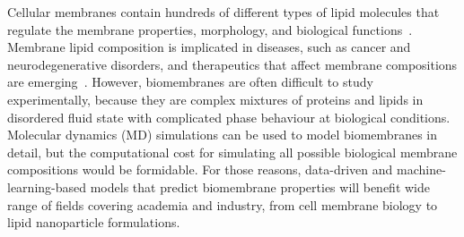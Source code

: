 \documentclass[fleqn,10pt]{wlscirep}
\begin{document}
Cellular membranes contain hundreds of different types of lipid molecules that regulate the membrane properties, morphology, and biological functions~\cite{vanmeer08,Lorent:2020a,Slatter:2016a}. Membrane lipid composition is implicated in diseases, such as cancer and neurodegenerative disorders, and therapeutics that affect membrane compositions are emerging~\cite{torres21}. However, biomembranes are often difficult to study experimentally, because they are complex mixtures of proteins and lipids in disordered fluid state with complicated phase behaviour at biological conditions. Molecular dynamics (MD) simulations can be used to model biomembranes in detail, but the computational cost for simulating all possible biological membrane compositions would be formidable. For those reasons, data-driven and machine-learning-based models that predict biomembrane properties will benefit wide range of fields covering academia and industry, from cell membrane biology to lipid nanoparticle formulations.

\end{document}
